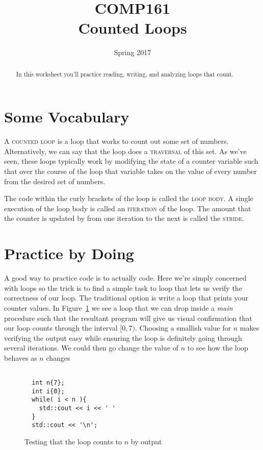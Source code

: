 \documentclass[nobib]{tufte-handout}
\title{COMP161 \\ Counted Loops}
\author{}
\date{Spring 2017}
\begin{document}
\maketitle

\begin{abstract}
  In this worksheet you'll practice reading, writing, and analyzing loops that count.
\end{abstract}

\section*{ Some Vocabulary }

A \textsc{counted loop} is a loop that works to count out some set of numbers. Alternatively, we can say that the loop does a \textsc{traversal} of this set. As we've seen, these loops typically work by modifying the state of a counter variable such that over the course of the loop that variable takes on the value of every number from the desired set of numbers.

The code within the curly brackets of the loop is called the \textsc{loop body}. A single execution of the loop body is called an \textsc{iteration} of the loop. The amount that the counter is updated by from one iteration to the next is called the \textsc{stride}.

\section*{ Practice by Doing }

A good way to practice code is to actually code. Here we're simply concerned with loops so the trick is to find a simple task to loop that lets us verify the correctness of our loop.  The traditional option is write a loop that prints your counter values. In Figure~\ref{fig:printloop} we see a loop that we can drop inside a \textit{main} procedure such that the resultant program will give us visual confirmation that our loop counts through the interval $[0,7)$. Choosing a smallish value for $n$ makes verifying the output easy while ensuring the loop is definitely going through several iterations. We could then go change the value of $n$ to see how the loop behaves as $n$ changes

\begin{figure}
\begin{lstlisting}

  int n{7};
  int i{0};
  while( i < n ){
    std::cout << i << ' '
  }
  std::cout << '\n';
\end{lstlisting}
\caption{ Testing that the loop counts to $n$ by output}
\label{fig:printloop}
\end{figure}
\end{document}
